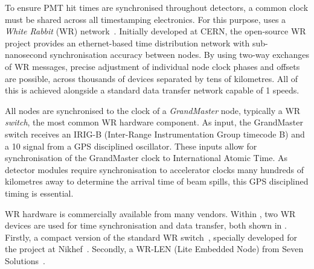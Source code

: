 To ensure PMT hit times are synchronised throughout \chips detectors, a common clock must be
shared across all timestamping electronics. For this purpose, \chips uses a \emph{White Rabbit}
(WR) network~\cite{lipinski2011}. Initially developed at CERN, the open-source WR project provides
an ethernet-based time distribution network with sub-nanosecond synchronisation accuracy between
nodes. By using two-way exchanges of WR messages, precise adjustment of individual node clock
phases and offsets are possible, across thousands of devices separated by tens of kilometres. All
of this is achieved alongside a standard data transfer network capable of \SI{1}{}
speeds.

All nodes are synchronised to the clock of a \emph{GrandMaster} node, typically a WR
\emph{switch}, the most common WR hardware component. As input, the GrandMaster switch receives an
IRIG-B (Inter-Range Instrumentation Group timecode B) and a \SI{10}{} signal from a GPS
disciplined oscillator. These inputs allow for synchronisation of the GrandMaster clock to
International Atomic Time. As \chips detector modules require synchronisation to accelerator
clocks many hundreds of kilometres away to determine the arrival time of beam spills, this GPS
disciplined timing is essential.

WR hardware is commercially available from many vendors. Within \chipsfive, two WR devices are
used for time synchronisation and data transfer, both shown in .
Firstly, a compact version of the standard WR switch~\cite{wrswitch2020}, specially developed for
the \chips project at Nikhef~\cite{wrchromium2020}. Secondly, a WR-LEN (Lite Embedded Node) from
Seven Solutions~\cite{wrlen2020}. 

